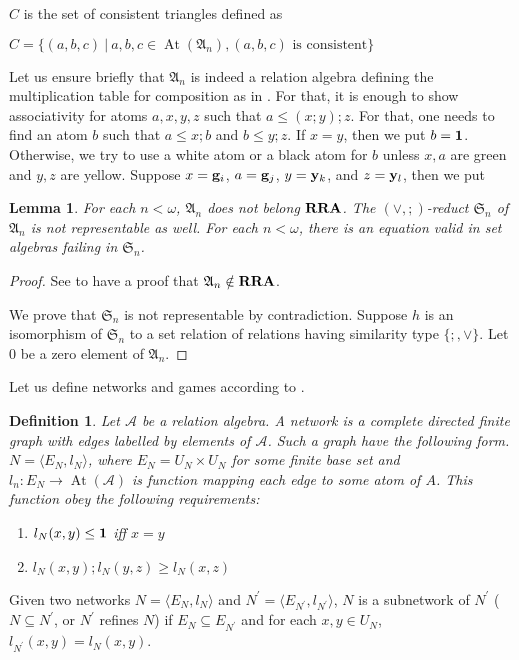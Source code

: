 \documentclass[a4paper]{article}
\theoremstyle{defin}
\newtheorem{defin}{Definition}
\theoremstyle{theorem}
\theoremstyle{prop}
\theoremstyle{lemma}
\newtheorem{lemma}{Lemma}
\theoremstyle{ex}
\theoremstyle{col}
\begin{document}
$C$ is the set of consistent triangles defined as

\begin{center}
  $C = \{ (a, b, c ) \: | \: a,b,c \in \operatorname{At}(\mathfrak{A}_n), (a,b,c) \text{ is consistent}\}$
\end{center}

Let us ensure briefly that $\mathfrak{A}_n$ is indeed a relation algebra defining the multiplication table for composition as in \cite{lyndon1950representation}. For that, it is enough to show associativity for atoms $a, x, y, z$ such that $a \leq (x ; y) ; z$. For that, one needs to find an atom $b$ such that $a \leq x ; b$ and $b \leq y ; z$. If $x = y$, then we put $b = {\bf 1}$. Otherwise, we try to use a white atom or a black atom for $b$ unless $x, a$ are green and $y, z$ are yellow.
Suppose $x = {\bf g}_i$, $a = {\bf g}_j$, $y = {\bf y}_k$, and $z = {\bf y}_l$, then we put

\begin{lemma}
  For each $n < \omega$, $\mathfrak{A}_n$ does not belong ${\bf RRA}$. The $(\vee, ;)$-reduct $\mathfrak{S}_n$ of $\mathfrak{A}_n$ is not representable as well. For each $n < \omega$, there is an equation valid in set algebras failing in $\mathfrak{S}_n$.
\end{lemma}

\begin{proof}
  See \cite{hodkinson2000axiomatizability} to have a proof that $\mathfrak{A}_n \notin {\bf RRA}$.

  We prove that $\mathfrak{S}_n$ is not representable by contradiction.
  Suppose $h$ is an isomorphism of $\mathfrak{S}_n$ to a set relation of relations having similarity type $\{ ;, \vee \}$. Let $0$ be a zero element of $\mathfrak{A}_n$.
\end{proof}

Let us define networks and games according to \cite{hirsch1997step}.

\begin{defin}
  Let $\mathcal{A}$ be a relation algebra. A network is a complete directed finite graph with edges labelled by elements of $\mathcal{A}$. Such a graph have the following form. $N = \langle E_N, l_N \rangle$, where $E_N = U_N \times U_N$ for some finite base set and $l_n : E_N \to \operatorname{At}(\mathcal{A})$ is function mapping each edge to some atom of $A$. This function obey the following requirements:
  \begin{enumerate}
    \item $l_N(x,y) \leq {\bf 1}$ iff $x = y$
    \item $l_N(x, y) ; l_N(y,z) \geq l_N(x,z)$
  \end{enumerate}
\end{defin}
Given two networks $N = \langle E_N, l_N \rangle$ and $N^{'} = \langle E_{N^{'}}, l_{N^{'}} \rangle$, $N$ is a subnetwork of $N^{'}$ ($N \subseteq N^{'}$, or $N^{'}$ refines $N$) if $E_N \subseteq E_{N^{'}}$ and for each $x,y \in U_N$, $l_{N^{'}}(x,y) = l_{N}(x,y)$.
\end{document}
